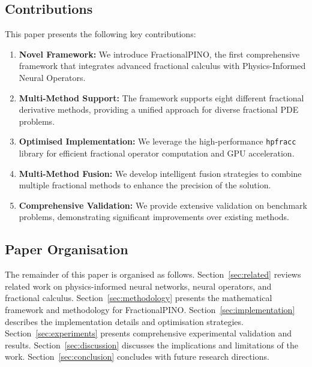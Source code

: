 \documentclass[12pt,a4paper]{article}
\theoremstyle{definition}
\begin{document}
\subsection{Contributions}

This paper presents the following key contributions:

\begin{enumerate}
    \item \textbf{Novel Framework:} We introduce FractionalPINO, the first comprehensive framework that integrates advanced fractional calculus with Physics-Informed Neural Operators.
    
    \item \textbf{Multi-Method Support:} The framework supports eight different fractional derivative methods, providing a unified approach for diverse fractional PDE problems.
    
    \item \textbf{Optimised Implementation:} We leverage the high-performance \texttt{hpfracc} library for efficient fractional operator computation and GPU acceleration.
    
    \item \textbf{Multi-Method Fusion:} We develop intelligent fusion strategies to combine multiple fractional methods to enhance the precision of the solution.
    
    \item \textbf{Comprehensive Validation:} We provide extensive validation on benchmark problems, demonstrating significant improvements over existing methods.
\end{enumerate}

\subsection{Paper Organisation}

The remainder of this paper is organised as follows. Section~\ref{sec:related} reviews related work on physics-informed neural networks, neural operators, and fractional calculus. Section~\ref{sec:methodology} presents the mathematical framework and methodology for FractionalPINO. Section~\ref{sec:implementation} describes the implementation details and optimisation strategies. Section~\ref{sec:experiments} presents comprehensive experimental validation and results. Section~\ref{sec:discussion} discusses the implications and limitations of the work. Section~\ref{sec:conclusion} concludes with future research directions.
\end{document}
